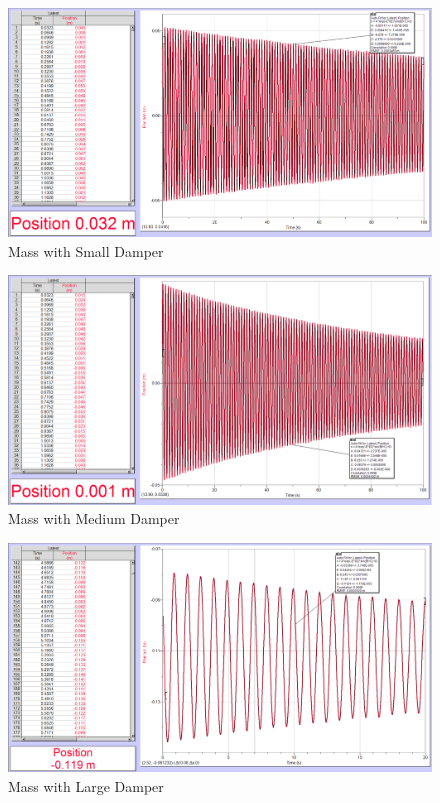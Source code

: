 \documentclass[]{article}
\begin{document}
\begin{figure}[H]
	\centering
	\includegraphics[width=\textwidth]{res/smallDamped}
	\caption{Mass with Small Damper}
	\label{fig:Mass with Small Damper}
\end{figure}

\begin{figure}[H]
	\centering
	\includegraphics[width=\textwidth]{res/middleDamped}
	\caption{Mass with Medium Damper}
	\label{fig:Mass with Medium Damper}
\end{figure}

\begin{figure}[H]
	\centering
	\includegraphics[width=\textwidth]{res/largeDamped}
	\caption{Mass with Large Damper}
	\label{fig:Mass with Large Damper}
\end{figure}
\end{document}
